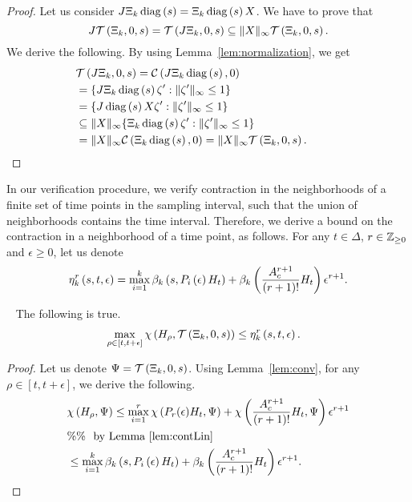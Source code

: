 \begin{proof}
Let us consider
$J\Xi_k\operatorname{diag}\left(s\right)=\Xi_k\operatorname{diag}\left(s\right)X$.
We have to prove that
\[
J\mathit{\operatorname{\mathcal{T}}}\left(\Xi_k,0,s\right)=\mathit{\operatorname{\mathcal{T}}}\left(J\Xi_k,0,s\right)\subseteq
\|X\|_\infty\mathit{\operatorname{\mathcal{T}}}\left(\Xi_k,0,s\right).
\]
We derive the following.  By using Lemma~\ref{lem:normalization}, we get
%
\begin{align*}
&  \mathit{\operatorname{\mathcal{T}}}\left(J\Xi_k,0,s\right)=\mathit{\mathcal{C}}\left(J\Xi_k\operatorname{diag}\left(s\right),0\right)\\
&=
  \{J\Xi_k\operatorname{diag}\left(s\right)\zeta^\prime:\|\zeta^\prime\|_{\infty} \leq 1\}\\
 & =
  \{J\operatorname{diag}\left(s\right)X\zeta^\prime:\|\zeta^\prime\|_\infty\leq 1\}\\
 & \subseteq
  \|X\|_\infty\{\Xi_k\operatorname{diag}\left(s\right)\zeta^\prime:\|\zeta^\prime\|_{\infty}\leq 1\}\\
 & =\|X\|_\infty\mathit{\mathcal{C}}\left(\Xi_k\operatorname{diag}\left(s\right),0\right)
=
\|X\|_{\infty}\mathit{\operatorname{\mathcal{T}}}\left(\Xi_k,0,s\right).\hspace{3em}\qedhere
\end{align*}
\end{proof}
%
In our verification procedure, we verify contraction in the
neighborhoods of a finite set of time points in the sampling interval,
such that the union of neighborhoods contains the time interval.
Therefore, we derive a bound on the contraction in a
neighborhood of a time point, as follows.  For any $t\in\Delta$,
$r\in\mathbb{Z}_{\geq 0}$ and
$\epsilon\geq 0$, let us denote
%
\[
\eta_{k}^{r}\left(s,t,\epsilon\right)=\max_{i=1}^k\beta_k\left(s,P_i\left(\epsilon\right)H_t\right)+\beta_k\left(\frac{A_c^{r+1}}{(r+1)!}H_t\right)\epsilon^{r+1}.
\]
%
\begin{theorem}~\label{thm:main-contraction}
  The following is true.
  \begin{align*}
& \max_{\rho\in[t,t+\epsilon]}\chi\left(H_\rho,\mathit{\operatorname{\mathcal{T}}}\left(\Xi_k,0,s\right)\right)\leq\eta_{k}^{r}\left(s,t,\epsilon\right).
  \end{align*}
\end{theorem}
%
\begin{proof}
Let us denote $\Psi=\mathit{\operatorname{\mathcal{T}}}\left(\Xi_k,0,s\right)$.  Using
Lemma~\ref{lem:conv}, for any
$\rho\in[t,t+\epsilon]$, we derive the following.
  \begin{align*}
&
    \chi\left(H_\rho,\Psi\right)\leq\max_{i=1}^r\chi\left(P_r(\epsilon)H_t,\Psi\right)+\chi\left(\frac{A_c^{r+1}}{(r+1)!}H_t,\Psi\right)\epsilon^{r+1}\\
    & \%\%~~\text{by Lemma~\ref{lem:contLin}}\\
& \leq \max_{i=1}^k\beta_k\left(s,P_i\left(\epsilon\right)H_t\right)+\beta_k\left(\frac{A_c^{r+1}}{(r+1)!}H_t\right)\epsilon^{r+1}.\hspace{3em}\qedhere  
  \end{align*}
\end{proof}
